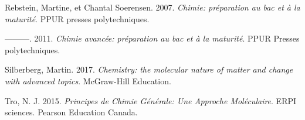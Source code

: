 \documentclass[
  11pt,
  french,
  a4paper,
  openany]{book}
\begin{document}
\leavevmode\hypertarget{ref-rebstein2007chimie}{}%
Rebstein, Martine, et Chantal Soerensen. 2007. \emph{Chimie: préparation au bac et à la maturité}. PPUR presses polytechniques.

\leavevmode\hypertarget{ref-rebstein2011chimie}{}%
---------. 2011. \emph{Chimie avancée: préparation au bac et à la maturité}. PPUR Presses polytechniques.

\leavevmode\hypertarget{ref-silberberg2017chemistry}{}%
Silberberg, Martin. 2017. \emph{Chemistry: the molecular nature of matter and change with advanced topics}. McGraw-Hill Education.

\leavevmode\hypertarget{ref-tro2015principes}{}%
Tro, N. J. 2015. \emph{Principes de Chimie Générale: Une Approche Moléculaire}. ERPI sciences. Pearson Education Canada.
\end{document}
